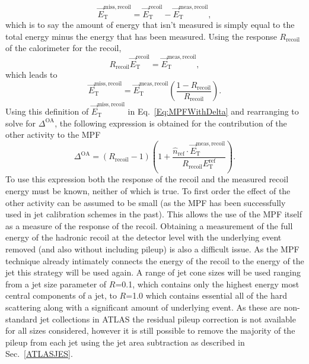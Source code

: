 \begin{equation}
  \vec{E}_{\mathrm T}^{\mathrm{miss, recoil}} = \vec{E}_{\mathrm T}^{\mathrm{recoil}} - \vec{E}_{\mathrm T}^{\mathrm{meas, recoil}}, 
\end{equation}
\noindent 
which is to say the amount of energy that isn't measured is simply equal to the total energy minus the energy that has been measured.  
Using the response $R_{\mathrm{recoil}}$ of the calorimeter for the recoil, 
\begin{equation}
  R_{\mathrm{recoil}}\vec{E}_{\mathrm T}^{\mathrm{recoil}} = \vec{E}_{\mathrm T}^{\mathrm{meas, recoil}}, 
\end{equation}
\noindent
which leads to 
\begin{equation}
  \vec{E}_{\mathrm T}^{\mathrm{miss, recoil}} = \vec{E}_{\mathrm T}^{\mathrm{meas, recoil}}\left(\frac{1-R_{\mathrm{recoil}}}{R_{\mathrm{recoil}}}\right).  
\end{equation}
\noindent
Using this definition of $\vec{E}_{\mathrm T}^{\mathrm{miss, recoil}}$ in Eq.~\ref{Eq:MPFWithDelta} and rearranging to solve for $\Delta^{\mathrm{OA}}$, the following expression is obtained for the contribution of the other activity to the MPF 
\begin{equation}
  \Delta^{\mathrm{OA}}=\left(R_{\mathrm{recoil}}-1\right)\left(1+\frac{\hat n_{\mathrm{ref}}\cdot \vec{E}_{\mathrm T}^{\mathrm{meas, recoil}}}{R_{\mathrm{recoil}}{E}_{\mathrm T}^{\mathrm{ref}}}\right).  
  \label{Eq:OA}
\end{equation} 
To use this expression both the response of the recoil and the measured recoil energy must be known, neither of which is true.  
To first order the effect of the other activity can be assumed to be small (as the MPF has been successfully used in jet calibration schemes in the past).  
This allows the use of the MPF itself as a measure of the response of the recoil.  
Obtaining a measurement of the full energy of the hadronic recoil at the detector level with the underlying event removed (and also without including pileup) is also a difficult issue.  
As the MPF technique already intimately connects the energy of the recoil to the energy of the jet this strategy will be used again.  
A range of jet cone sizes will be used ranging from a jet size parameter of $R$=0.1, which contains only the highest energy most central components of a jet, to $R$=1.0 which contains essential all of the hard scattering along with a significant amount of underlying event.   
As these are non-standard jet collections in ATLAS the residual pileup correction is not available for all sizes considered, however it is still possible to remove the majority of the pileup from each jet using the jet area subtraction as described in Sec.~\ref{ATLASJES}.  

